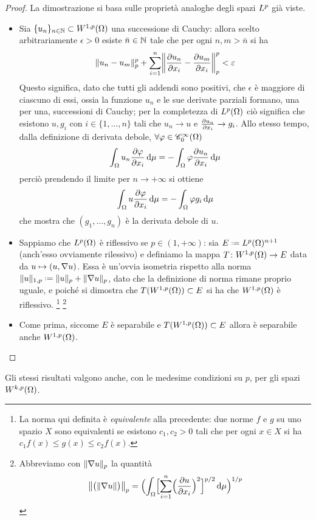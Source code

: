 \begin{proof}
    La dimostrazione si basa sulle proprietà analoghe degli spazi $\lclass[p]$ già viste.
    \begin{itemize}
        \item Sia $\{u_n\}_{n\in\N}\subset\sobW[1,p]{\Omega}$ una successione di Cauchy: allora scelto arbitrariamente $\epsilon>0$ esiste $\bar{n}\in\N$ tale che per ogni $n,m>\bar{n}$ si ha
            \begin{equation}
                \norm{u_n-u_m}_p^p+\sum_{i=1}^n\norm[\bigg]{\drp{u_n}{x_i}-\drp{u_m}{x_i}}_p^p<\epsilon
            \end{equation}
            Questo significa, dato che tutti gli addendi sono positivi, che $\epsilon$ è maggiore di ciascuno di essi, ossia la funzione $u_n$ e le sue derivate parziali formano, una per una, successioni di Cauchy; per la completezza di $\leb[p]{\Omega}$ ciò significa che esistono $u,g_i$ con $i\in\{1,\dotsc,n\}$ tali che $u_n\to u$ e $\drp{u_n}{x_i}\to g_i$.
            Allo stesso tempo, dalla definizione di derivata debole, $\forall\phi\in\contsc[\infty]{\Omega}$
            \begin{equation}
                \int_\Omega u_n\drp{\phi}{x_i}\,\dd\mu=-\int_\Omega\phi\drp{u_n}{x_i}\,\dd\mu
            \end{equation}
            perciò prendendo il limite per $n\to +\infty$ si ottiene
            \begin{equation}
                \int_\Omega u\drp{\phi}{x_i}\,\dd\mu=-\int_\Omega \phi g_i\,\dd\mu
            \end{equation}
            che mostra che $(g_1,\dotsc,g_n)$ è la derivata debole di $u$.
        \item Sappiamo che $\leb[p]{\Omega}$ è riflessivo se $p\in(1,+\infty)$: sia $E\defeq\leb[p]{\Omega}^{n+1}$ (anch'esso ovviamente rilessivo) e definiamo la mappa $T\colon\sobW[1,p]{\Omega}\to E$ data da $u\mapsto(u,\grad u)$.
            Essa è un'ovvia isometria rispetto alla norma $\norm{u}_{1,p}\defeq\norm{u}_p+\norm{\grad u}_p$, dato che la definizione di norma rimane proprio uguale, e poich\'e si dimostra che $T(\sobW[1,p]{\Omega})\subset E$ si ha che $\sobW[1,p]{\Omega}$ è riflessivo.
            \footnote{La norma qui definita è \emph{equivalente} alla precedente: due norme $f$ e $g$ su uno spazio $X$ sono equivalenti se esistono $c_1,c_2>0$ tali che per ogni $x\in X$ si ha $c_1f(x)\le g(x)\le c_2 f(x)$.}
            \footnote{Abbreviamo con $\norm{\grad u}_p$ la quantità
            \begin{equation}
                \norm[\big]{\bigl(\norm{\grad u}\bigr)}_p=\Bigl(\int_\Omega\Bigl[\sum_{i=1}^n\Bigl(\drp{u}{x_i}\Bigr)^2\Bigr]^{p/2}\,\dd\mu\Bigr)^{1/p}
            \end{equation}}
        \item Come prima, siccome $E$ è separabile e $T(\sobW[1,p]{\Omega})\subset E$ allora è separabile anche $\sobW[1,p]{\Omega}$.\qedhere
    \end{itemize}
\end{proof}
Gli stessi risultati valgono anche, con le medesime condizioni su $p$, per gli spazi $\sobW[k,p]{\Omega}$.

